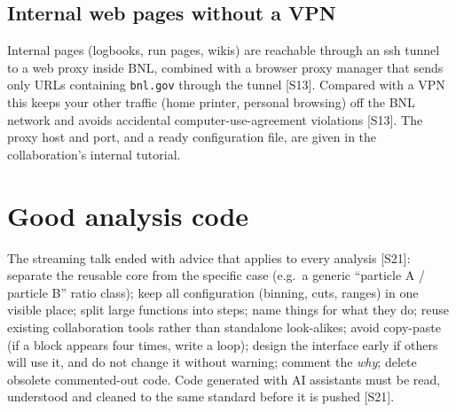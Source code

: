 \documentclass[11pt,letterpaper]{article}
\newcommand{\code}[1]{\texttt{#1}}
\begin{document}
\subsection{Internal web pages without a VPN}
Internal pages (logbooks, run pages, wikis) are reachable through an ssh tunnel to a web proxy inside BNL, combined with a browser proxy manager that sends only URLs containing \code{bnl.gov} through the tunnel [S13].
Compared with a VPN this keeps your other traffic (home printer, personal browsing) off the BNL network and avoids accidental computer-use-agreement violations [S13].
The proxy host and port, and a ready configuration file, are given in the collaboration's internal tutorial.

\section{Good analysis code}\label{sec:code}
The streaming talk ended with advice that applies to every analysis [S21]: separate the reusable core from the specific case (e.g.\ a generic ``particle A / particle B'' ratio class); keep all configuration (binning, cuts, ranges) in one visible place; split large functions into steps; name things for what they do; reuse existing collaboration tools rather than standalone look-alikes; avoid copy-paste (if a block appears four times, write a loop); design the interface early if others will use it, and do not change it without warning; comment the \emph{why}; delete obsolete commented-out code. Code generated with AI assistants must be read, understood and cleaned to the same standard before it is pushed [S21].
\end{document}
